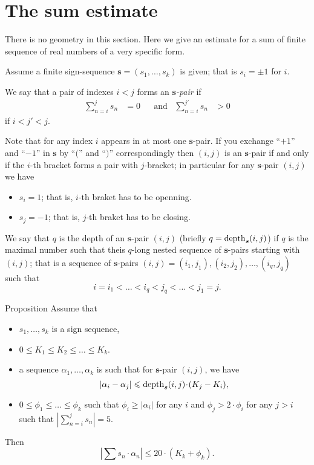 \documentclass[a4paper,10pt]{amsart}
\begin{document}
\section{The sum estimate}

There is no geometry in this section.
Here we give an estimate for a sum 
of finite sequence of real numbers 
of a very specific form.


Assume a finite  sign-sequence $\bm{s}=(s_1,\dots, s_k)$
is given;
that is $s_i=\pm1$ for $i$.

We say that a pair of indexes $i< j$
forms an \emph{$\bm{s}$-pair} 
if 
\begin{align*}
\sum_{n=i}^js_n&=0&&
\text{and}&
\sum_{n=i}^{j'}s_n&>0
\end{align*} 
if $i<j'<j$.

Note that for any index $i$ appears in at most one $\bm{s}$-pair.
If you exchange ``$+1$'' and ``$-1$'' in $\bm{s}$ by ``$($'' and ``$)$'' correspondingly then $(i,j)$ is an $\bm{s}$-pair
if and only if the $i$-th bracket forms a pair with $j$-bracket;
in particular for any $\bm{s}$-pair $(i,j)$ we have
\begin{itemize}
\item $s_i=1$; that is, $i$-th braket has to be openning.
 \item $s_j=-1$; that is, $j$-th braket has to be closing.
\end{itemize}

We say that $q$ is the depth of an $\bm{s}$-pair $(i,j)$
(briefly $q=\mathop{\rm depth}\nolimits_{\bm{s}}(i,j)$) 
if $q$ is the maximal number such that theis $q$-long nested sequence of $\bm{s}$-pairs starting with $(i,j)$; 
that is a sequence of $\bm{s}$-pairs
$(i,j)=(i_1,j_1),(i_2,j_2),\dots,(i_q,j_q)$ such that
\[i=i_1<\dots<i_q<j_q<\dots<j_1=j.\]

\begin{thm}{Proposition}
Assume that
\begin{itemize}
\item $s_1,\dots, s_k$ is a sign sequence,
\item $0\le K_1\le K_2\le \dots\le K_k$.
\item a sequence $\alpha_1,\dots,\alpha_k$ is such that for $\bm{s}$-pair $(i,j)$, we have
\[|\alpha_i-\alpha_j|\le \depth_{\bm{s}}(i,j)\cdot(K_j-K_i),\]
\item $0\le \phi_1\le\dots\le\phi_k$ such that $\phi_i\ge |\alpha_i|$ for any $i$ and $\phi_j>2\cdot\phi_i$ for any $j>i$ such that $|\sum_{n=i}^js_n|=5$.
\end{itemize}
Then
\[|\sum s_n\cdot \alpha_n|\le 20\cdot( K_k+ \phi_k).\]

\end{thm}
\end{document}
